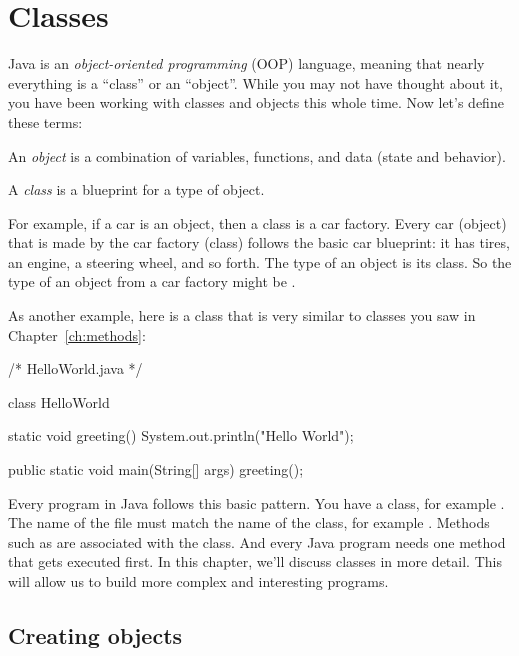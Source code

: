 \chapter{Classes}
\label{ch:classes}

Java is an \emph{object-oriented programming} (OOP) language, meaning that nearly everything is a ``class'' or an ``object''. While you may not have thought about it, you have been working with classes and objects this whole time. Now let's define these terms:

\begin{definition}
An \emph{object} is a combination of variables, functions, and data (state and behavior).
\end{definition}

\begin{definition}
A \emph{class} is a blueprint for a type of object.
\end{definition}

For example, if a car is an object, then a class is a car factory. Every car (object) that is made by the car factory (class) follows the basic car blueprint: it has tires, an engine, a steering wheel, and so forth. The type of an object is its class. So the type of an object from a car factory might be .

As another example, here is a class that is very similar to classes you saw in Chapter~\ref{ch:methods}:

\begin{code}
/* HelloWorld.java */

class HelloWorld {

    static void greeting() {
        System.out.println("Hello World");
    } 

    public static void main(String[] args) {
        greeting();
    }
}
\end{code}

Every program in Java follows this basic pattern. You have a class, for example . The name of the file must match the name of the class, for example . Methods such as  are associated with the class. And every Java program needs one  method that gets executed first. In this chapter, we'll discuss classes in more detail. This will allow us to build more complex and interesting programs.

\section{Creating objects}

